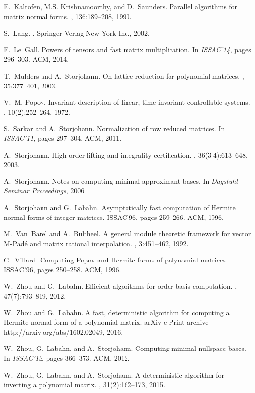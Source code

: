 \documentclass[preprint]{sig-alternate-05-2015}
\begin{document}
\begin{tiny}
\begin{thebibliography}{10}
E.~Kaltofen, M.S. Krishnamoorthy, and D.~Saunders.
\newblock Parallel algorithms for matrix normal forms.
, 136:189--208, 1990.

S.~Lang.
.
\newblock Springer-Verlag New-York Inc., 2002.

F.~Le~Gall.
\newblock Powers of tensors and fast matrix multiplication.
\newblock In {\em ISSAC'14}, pages 296--303. ACM, 2014.

T.~Mulders and A.~Storjohann.
\newblock On lattice reduction for polynomial matrices.
, 35:377--401, 2003.

V.~M. Popov.
\newblock Invariant description of linear, time-invariant controllable systems.
, 10(2):252--264, 1972.

S.~Sarkar and A.~Storjohann.
\newblock Normalization of row reduced matrices.
\newblock In {\em ISSAC'11}, pages 297--304. ACM, 2011.

A.~Storjohann.
\newblock High-order lifting and integrality certification.
, 36(3-4):613--648, 2003.

A.~Storjohann.
\newblock Notes on computing minimal approximant bases.
\newblock In {\em Dagstuhl Seminar Proceedings}, 2006.

A.~Storjohann and G.~Labahn.
\newblock Asymptotically fast computation of {H}ermite normal forms of integer
  matrices.
\newblock ISSAC'96, pages 259--266. ACM, 1996.

M.~Van~Barel and A.~Bultheel.
\newblock A general module theoretic framework for vector {M-Pad\'e} and matrix
  rational interpolation.
, 3:451--462, 1992.

G.~Villard.
\newblock Computing {Popov} and {Hermite} forms of polynomial matrices.
\newblock ISSAC'96, pages 250--258. ACM, 1996.

W.~Zhou and G.~Labahn.
\newblock Efficient algorithms for order basis computation.
, 47(7):793--819, 2012.

W.~Zhou and G.~Labahn.
\newblock A fast, deterministic algorithm for computing a {H}ermite normal form
  of a polynomial matrix.
\newblock arXiv e-Print archive - http://arxiv.org/abs/1602.02049, 2016.

W.~Zhou, G.~Labahn, and A.~Storjohann.
\newblock Computing minimal nullspace bases.
\newblock In {\em ISSAC'12}, pages 366--373. ACM, 2012.

W.~Zhou, G.~Labahn, and A.~Storjohann.
\newblock A deterministic algorithm for inverting a polynomial matrix.
, 31(2):162--173, 2015.

\end{thebibliography}
\end{tiny}
\end{document}
